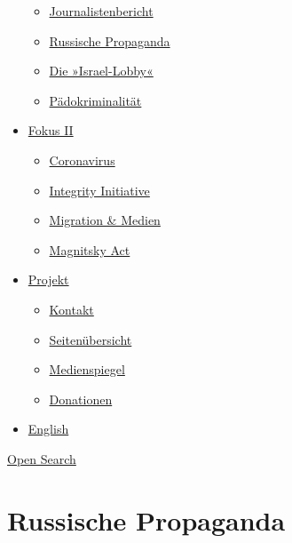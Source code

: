 \begin{itemize}
  \begin{itemize}
  \tightlist
  \item
    \href{https://swprs.org/bericht-eines-journalisten/}{Journalistenbericht}
  \item
    \href{https://swprs.org/russische-propaganda/}{Russische Propaganda}
  \item
    \href{https://swprs.org/die-israel-lobby-fakten-und-mythen/}{Die
    »Israel-Lobby«}
  \item
    \href{https://swprs.org/geopolitik-und-paedokriminalitaet/}{Pädokriminalität}
  \end{itemize}
\item
  \href{https://swprs.org/migration-und-medien/}{Fokus II}

  \begin{itemize}
  \tightlist
  \item
    \href{https://swprs.org/covid-19-hinweis-ii/}{Coronavirus}
  \item
    \href{https://swprs.org/die-integrity-initiative/}{Integrity
    Initiative}
  \item
    \href{https://swprs.org/migration-und-medien/}{Migration \& Medien}
  \item
    \href{https://swprs.org/der-fall-magnitsky/}{Magnitsky Act}
  \end{itemize}
\item
  \href{https://swprs.org/kontakt/}{Projekt}

  \begin{itemize}
  \tightlist
  \item
    \href{https://swprs.org/kontakt/}{Kontakt}
  \item
    \href{https://swprs.org/uebersicht/}{Seitenübersicht}
  \item
    \href{https://swprs.org/medienspiegel/}{Medienspiegel}
  \item
    \href{https://swprs.org/donationen/}{Donationen}
  \end{itemize}
\item
  \href{https://swprs.org/contact/}{English}
\end{itemize}

\protect\hyperlink{}{Open Search}

\hypertarget{russische-propaganda}{%
\section{Russische Propaganda}\label{russische-propaganda}}

